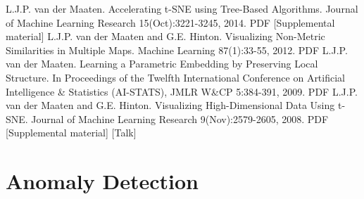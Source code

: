 L.J.P. van der Maaten. Accelerating t-SNE using Tree-Based Algorithms. Journal of Machine Learning Research 15(Oct):3221-3245, 2014. PDF [Supplemental material]
L.J.P. van der Maaten and G.E. Hinton. Visualizing Non-Metric Similarities in Multiple Maps. Machine Learning 87(1):33-55, 2012. PDF
L.J.P. van der Maaten. Learning a Parametric Embedding by Preserving Local Structure. In Proceedings of the Twelfth International Conference on Artificial Intelligence & Statistics (AI-STATS), JMLR W&CP 5:384-391, 2009. PDF
L.J.P. van der Maaten and G.E. Hinton. Visualizing High-Dimensional Data Using t-SNE. Journal of Machine Learning Research 9(Nov):2579-2605, 2008. PDF [Supplemental material] [Talk]

\section{Anomaly Detection}



